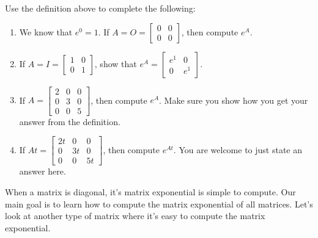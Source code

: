 \begin{problem}
 Use the definition above to complete the following:
\begin{enumerate}
 \item We know that $e^0=1$. If $A=O=\begin{bmatrix}0&0\\0&0\end{bmatrix}$, then compute $e^{A}$.
 \item If $A=I=\begin{bmatrix}1&0\\0&1\end{bmatrix}$, show that $e^{A}=\begin{bmatrix}e^1&0\\0&e^1\end{bmatrix}$.
 \item If $A=\begin{bmatrix}2&0&0\\0&3&0\\0&0&5\end{bmatrix}$, then compute $e^A$. Make sure you show how you get your answer from the definition.
 \item If $At=\begin{bmatrix}2t&0&0\\0&3t&0\\0&0&5t\end{bmatrix}$, then compute $e^{At}$. You are welcome to just state an answer here. 
\end{enumerate}
\end{problem}

When a matrix is diagonal, it's matrix exponential is simple to compute.  Our main goal is to learn how to compute the matrix exponential of all matrices. Let's look at another type of matrix where it's easy to compute the matrix exponential. 


